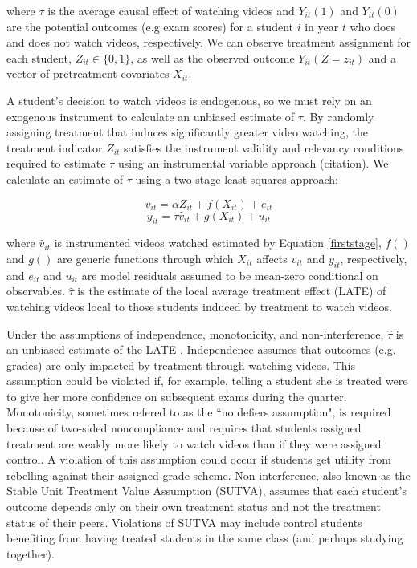 \documentclass[12pt]{article}
\begin{document}
where $\tau$ is the average causal effect of watching videos and $Y_{it}(1)$ and $Y_{it}(0)$ are the potential outcomes (e.g exam scores) for a student $i$ in year $t$ who does and does not watch videos, respectively. We can observe treatment assignment for each student, $Z_{it} \in \{0,1\}$, as well as the observed outcome $Y_{it}(Z=z_{it})$ and a vector of pretreatment covariates $X_{it}$.

A student's decision to watch videos is endogenous, so we must rely on an exogenous instrument to calculate an unbiased estimate of $\tau$. By randomly assigning treatment that induces significantly greater video watching, the treatment indicator $Z_{it}$ satisfies the instrument validity and relevancy conditions required to estimate $\tau$ using an instrumental variable approach (citation). We calculate an estimate of $\tau$ using a two-stage least squares approach:

\begin{equation} \label{firststage}
	v_{it} = \alpha Z_{it} + f(X_{it}) + e_{it}
\end{equation}
\begin{equation} \label{secondstage}
	y_{it} = \tau \hat{v}_{it} + g(X_{it}) + u_{it}
\end{equation}

where $\hat{v}_{it}$ is instrumented videos watched estimated by Equation \ref{firststage}, $f()$ and $g()$ are generic functions through which $X_{it}$ affects $v_{it}$ and $y_{it}$, respectively, and $e_{it}$ and $u_{it}$ are model residuals assumed to be mean-zero conditional on observables. $\hat{\tau}$ is the estimate of the local average treatment effect (LATE) of watching videos local to those students induced by treatment to watch videos. 

Under the assumptions of independence, monotonicity, and non-interference, $\hat{\tau}$ is an unbiased estimate of the LATE \parencite{ai1995}. Independence assumes that outcomes (e.g. grades) are only impacted by treatment through watching videos. This assumption could be violated if, for example, telling a student she is treated were to give her more confidence on subsequent exams during the quarter. Monotonicity, sometimes refered to as the ``no defiers assumption", is required because of two-sided noncompliance and requires that students assigned treatment are weakly more likely to watch videos than if they were assigned control. A violation of this assumption could occur if students get utility from rebelling against their assigned grade scheme. Non-interference, also known as the Stable Unit Treatment Value Assumption (SUTVA), assumes that each student's outcome depends only on their own treatment status and not the treatment status of their peers. Violations of SUTVA may include control students benefiting from having treated students in the same class (and perhaps studying together).
\end{document}
